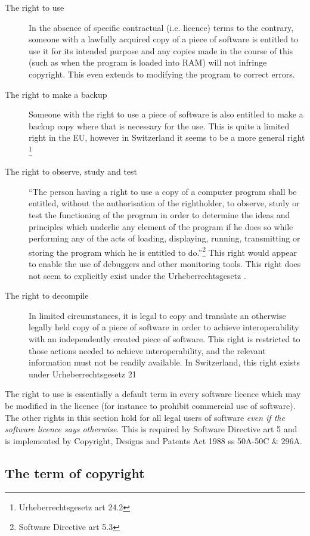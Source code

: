 \documentclass[a4paper,12pt]{article}
\newcommand{\CDPA}[1][]{Copyright, Designs and Patents Act 1988 #1\xspace}
\newcommand{\SD}[1][]{Software Directive #1\xspace}
\newcommand{\URG}[1][]{Urheberrechtsgesetz #1\xspace}
\begin{document}
\begin{description}
\item[The right to use] In the absence of specific contractual
  (i.e. licence) terms to the contrary, someone with a lawfully acquired
  copy of a piece of software is entitled to use it for its intended purpose
  and any copies made in the course of this (such as when the program is
  loaded into RAM) will not infringe copyright. This even extends to
  modifying the program to correct errors.
\item[The right to make a backup] Someone with the right to use a piece of
  software is also entitled to make a backup copy where that is necessary
  for the use. This is quite a limited right in the EU, however in
  Switzerland it seems to be a more general right \footnote{\URG[art 24.2]}
\item[The right to observe, study and test] ``The person having a right to
  use a copy of a computer program shall be entitled, without the
  authorisation of the rightholder, to observe, study or test the
  functioning of the program in order to determine the ideas and principles
  which underlie any element of the program if he does so while performing
  any of the acts of loading, displaying, running, transmitting or storing
  the program which he is entitled to do.''\footnote{\SD[art 5.3]} This
  right would appear to enable the use of debuggers and other monitoring
  tools. This right does not seem to explicitly exist under the \URG.
\item [The right to decompile] In limited circumstances, it is legal to copy
  and translate an otherwise legally held copy of a piece of software in
  order to achieve interoperability with an independently created piece of
  software. This right is restricted to those actions needed to achieve
  interoperability, and the relevant information must not be readily
  available. In Switzerland, this right exists under \URG[21]
\end{description}

The right to use is essentially a default term in every software licence
which may be modified in the licence (for instance to prohibit commercial
use of software). The other rights in this
section hold for all legal users of software \emph{even if the software
  licence says otherwise}. This is required by \SD[art 5] and is implemented
by \CDPA[ss 50A-50C \& 296A].

\subsection{The term of copyright}
\end{document}

